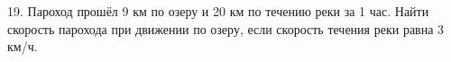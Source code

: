 19. Пароход прошёл 9 км по озеру и 20 км по течению реки за 1 час. Найти скорость парохода при движении по озеру, если скорость течения реки равна 3 км/ч.\\
